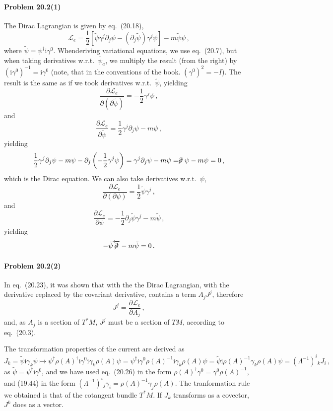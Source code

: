 \documentclass[a4paper,12pt]{article}
\def\imagi{\mathrm{i}}
\newcommand{\problem}[1]{\paragraph{Problem #1}}
\begin{document}
\problem{20.2(1)} The Dirac Lagrangian is given by eq.\ (20.18),
\[
 \mathcal{L}_e = \frac{1}{2}\left[ \tilde\psi \gamma^j \partial_j \psi - (\partial_j \tilde\psi)\gamma^j \psi\right] -m\tilde{\psi}\psi\,,\tag{20.18}
\]
where $\tilde\psi = \psi^\dagger \imagi \gamma^0$. Whenderiving variational equations, we use eq.\ (20.7), but when taking derivatives w.r.t.\ $\bar\psi_a$,  we multiply the result (from the right) by $(\imagi \gamma^0)^{-1} = \imagi \gamma^0$ (note, that in the conventions of the book. $(\gamma^0)^2 = -I$). The result is the same as if we took derivatives w.r.t.\ $\tilde\psi$, yielding
\[
 \frac{\partial\mathcal{L}_e}{\partial(\partial\tilde\psi)} = -\frac{1}{2}\gamma^j \psi\,,
\]
and
\[
 \frac{\partial\mathcal{L}_e}{\partial \tilde\psi} = \frac{1}{2}\gamma^j \partial_j \psi - m\psi\,,
\]
yielding
\[
 \frac{1}{2}\gamma^j \partial_j \psi - m\psi - \partial_j \left(-\frac{1}{2}\gamma^j \psi\right) = \gamma^j \partial_j \psi - m\psi = \centernot\partial\psi - m \psi = 0\,,
\]
which is the Dirac equation. We can also take derivatives w.r.t.\ $\psi$,
\[
 \frac{\partial\mathcal{L}_e}{\partial(\partial\psi)} = \frac{1}{2}\tilde\psi\gamma^j\,,
\]
and
\[
 \frac{\partial\mathcal{L}_e}{\partial \psi} = -\frac{1}{2}\partial_j \tilde\psi\gamma^j - m\tilde\psi\,,
\]
yielding
\[
 -\tilde\psi \overleftarrow{\centernot\partial}-m\tilde\psi=0\,.
\]


\problem{20.2(2)} In eq.\ (20.23), it was shown that with the the Dirac Lagrangian, with the derivative replaced by the covariant derivative, contains a term $A_j J^j$, therefore
\[
 J^j = \frac{\partial \mathcal{L}_e}{\partial A_j}\,,
\]
and, as $A_j$ is a section of $T^*M$, $J^j$ must be a section of $TM$, according to eq.\ (20.3).

The transformation properties of the current are derived as
\[
 J_k = \tilde\psi \imagi \gamma_k \psi \mapsto \psi^\dagger \rho(A)^\dagger \imagi \gamma^0 \imagi \gamma_k \rho(A) \psi = \psi^\dagger \imagi \gamma^0 \rho(A)^{-1} \imagi \gamma_k \rho(A) \psi = \tilde\psi \imagi \rho(A)^{-1}\gamma_k \rho(A)\psi = (\Lambda^{-1})^i{}_k J_i\,,
\]
as $\tilde\psi=\psi^\dagger\imagi\gamma^0$, and we have used eq.\ (20.26) in the form $\rho(A)^\dagger \gamma^0 = \gamma^0 \rho(A)^{-1}$, and (19.44) in the form $(\Lambda^{-1})^i{}_j \gamma_i = \rho(A)^{-1}\gamma_j \rho(A)$. The tranformation rule we obtained is that of the cotangent bundle $T^*M$. If $J_k$ transforms as a covector, $J^k$ does as a vector.
\end{document}
